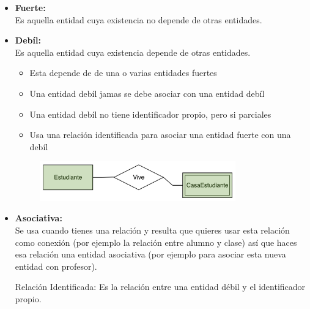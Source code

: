\documentclass[12pt, fleqn]{report}                             %
\theoremstyle{break}                                            %
\begin{document}
            \begin{itemize}
                \item \textbf{Fuerte:}\\
                    Es aquella entidad cuya existencia no depende de otras entidades.
                \item 
                    \textbf{Debíl:}\\
                    Es aquella entidad cuya existencia depende de otras entidades.
                    \begin{itemize}
                        \item Esta depende de de una o varias entidades fuertes
                        \item Una entidad debíl jamas se debe asociar con una entidad debíl
                        \item Una entidad debíl no tiene identificador propio, pero si parciales
                        \item Usa una relación identificada para asociar una entidad fuerte con una debíl
                    \end{itemize}

                    \begin{figure}[h]
                        \centering
                        \includegraphics[width=0.80\textwidth]{EjemploEntidadDebil}
                    \end{figure}

                \clearpage

                \item \textbf{Asociativa:}\\
                    Se usa cuando tienes una relación y resulta que quieres usar esta relación
                    como conexión (por ejemplo la relación entre alumno y clase) así que haces
                    esa relación una entidad asociativa (por ejemplo para asociar esta nueva
                    entidad con profesor).

                    Relación Identificada: Es la relación entre una entidad débil y el
                    identificador propio.


\end{itemize}
\end{document}
